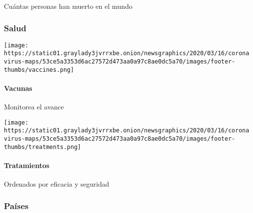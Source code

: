 Cuántas personas han muerto en el mundo

\hypertarget{salud}{%
\subsubsection{Salud}\label{salud}}

\href{https://www.nytimes3xbfgragh.onion/interactive/2020/science/coronavirus-vaccine-tracker.html}{}

\texttt{[image: https://static01.graylady3jvrrxbe.onion/newsgraphics/2020/03/16/coronavirus-maps/53ce5a3353d6ac27572d473aa0a97c8ae0dc5a70/images/footer-thumbs/vaccines.png]}

\hypertarget{vacunas}{%
\paragraph{Vacunas}\label{vacunas}}

Monitorea el avance

\href{https://www.nytimes3xbfgragh.onion/interactive/2020/science/coronavirus-drugs-treatments.html}{}

\texttt{[image: https://static01.graylady3jvrrxbe.onion/newsgraphics/2020/03/16/coronavirus-maps/53ce5a3353d6ac27572d473aa0a97c8ae0dc5a70/images/footer-thumbs/treatments.png]}

\hypertarget{tratamientos}{%
\paragraph{Tratamientos}\label{tratamientos}}

Ordenados por eficacia y seguridad

\hypertarget{pauxedses}{%
\subsubsection{Países}\label{pauxedses}}

